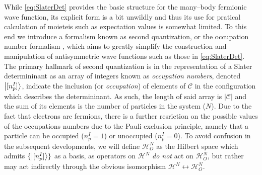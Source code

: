 While \cref{eq:SlaterDet} provides the basic structure for the many--body fermionic wave function, its explicit form
is a bit unwildly and thus its use for pratical calculation of moieteis such as expectation values is somewhat limited.
To this end we introduce a formalism known as second quantization, or the occupation number formalism \cite{Walecka12_book},
which aims to greatly simplify the construction and manipulation of antisymmetric wave functions such as those in 
\cref{eq:SlaterDet}. The primary hallmark of second quantization is in the representation of a Slater determininant 
as an array of integers known as \emph{occupation numbers}, denoted $\left\vert [n_p^I] \right\rangle$, indicate the inclusion (or \emph{occupation}) of elements
of $\mathcal{C}$ in the configuration which describes the determininant. As such, the length of said array is $\vert \mathcal{C} \vert$
and the sum of its elements is the number of particles in the system ($N$). Due to the fact that electrons are fermions,
there is a further resriction on the possible values of the occupations numbers due to the Pauli exclusion principle,
namely that a particle can be occupied ($n^I_p=1$) or unoccupied ($n^I_p=0$). To avoid confusion in the subsequent developments,
we will define $\mathcal{H}^N_O$ as the Hilbert space which admits $\{\left\vert [n_p^I] \right\rangle\}$ as a basis, as operators on $\mathcal{H}^N$ 
\emph{do not} act on $\mathcal{H}^N_O$, but rather may act indirectly through the obvious isomorphism 
$\mathcal{H}^N \leftrightarrow \mathcal{H}^N_O$.

